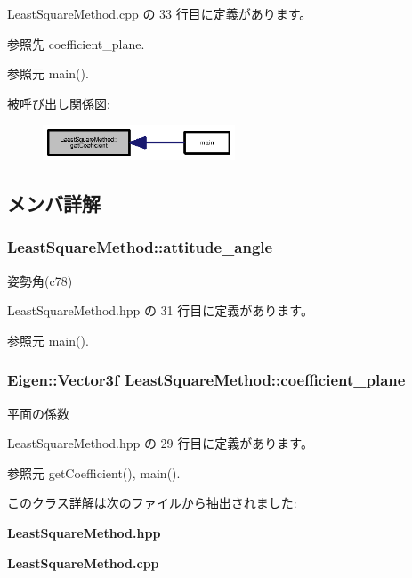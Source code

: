  Least\-Square\-Method.\-cpp の 33 行目に定義があります。



参照先 coefficient\-\_\-plane.



参照元 main().



被呼び出し関係図\-:\nopagebreak
\begin{figure}[H]
\begin{center}
\leavevmode
\includegraphics[width=162pt]{class_least_square_method_a19559c76884063927045732a38fe043b_icgraph}
\end{center}
\end{figure}




\subsection{メンバ詳解}
\subsubsection[{attitude\-\_\-angle}]{ Least\-Square\-Method\-::attitude\-\_\-angle}\label{class_least_square_method_a1ceee2394280e7d14411644de171782c}


姿勢角(c78) 



 Least\-Square\-Method.\-hpp の 31 行目に定義があります。



参照元 main().

\subsubsection[{coefficient\-\_\-plane}]{\setlength{\rightskip}{0pt plus 5cm}Eigen\-::\-Vector3f Least\-Square\-Method\-::coefficient\-\_\-plane}\label{class_least_square_method_a3b3f2a5f264c576367c3fb3e5d70dcf2}


平面の係数 



 Least\-Square\-Method.\-hpp の 29 行目に定義があります。



参照元 get\-Coefficient(), main().



このクラス詳解は次のファイルから抽出されました\-:\begin{DoxyCompactItemize}
\item 
{\bf Least\-Square\-Method.\-hpp}\item 
{\bf Least\-Square\-Method.\-cpp}\end{DoxyCompactItemize}
